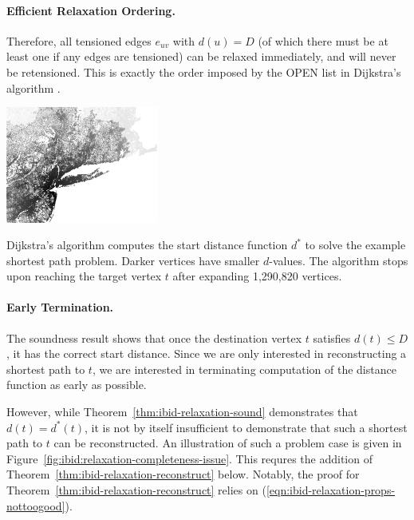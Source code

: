 \paragraph{Efficient Relaxation Ordering.}
Therefore,
all tensioned edges $e_{uv}$ with $d(u) = D$
(of which there must be at least one if any edges are tensioned)
can be relaxed immediately,
and will never be retensioned.
This is exactly the order imposed by the OPEN list in Dijkstra's
algorithm \citep{dijkstra1959anote}.

\begin{marginfigure}%
   \centering%
   \includegraphics[width=5cm]{figs/incbi-road-ne/singleshot/example-dijkstra.png}%
   \caption{Dijkstra's algorithm computes the start distance function
      $d^*$ to solve the example shortest path problem.
      Darker vertices have smaller $d$-values.
      The algorithm stops upon reaching the target vertex $t$
      after expanding 1,290,820 vertices.}%
   \label{fig:ibid:example-distance}%
\end{marginfigure}

\paragraph{Early Termination.}
The soundness result shows that once the destination
vertex $t$ satisfies $d(t) \leq D$,
it has the correct start distance.
Since we are only interested in reconstructing a shortest path to $t$,
we are interested in terminating computation of the distance
function as early as possible.

However,
while Theorem~\ref{thm:ibid-relaxation-sound} demonstrates
that $d(t) = d^*(t)$,
it is not by itself insufficient
to demonstrate that such a shortest path to $t$ can be reconstructed.
An illustration of such a problem case is given in
Figure~\ref{fig:ibid:relaxation-completeness-issue}.
This requres the addition of
Theorem~\ref{thm:ibid-relaxation-reconstruct} below.
Notably,
the proof for Theorem~\ref{thm:ibid-relaxation-reconstruct}
relies on (\ref{eqn:ibid-relaxation-props-nottoogood}).

